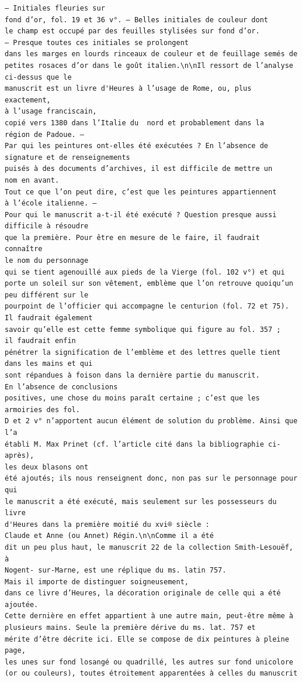 \documentclass[a4paper,12pt,twoside]{book}
\begin{document}
\begin{verbatim}
— Initiales fleuries sur 
fond d’or, fol. 19 et 36 v°. — Belles initiales de couleur dont 
le champ est occupé par des feuilles stylisées sur fond d’or. 
— Presque toutes ces initiales se prolongent 
dans les marges en lourds rinceaux de couleur et de feuillage semés de
petites rosaces d’or dans le goût italien.\n\nIl ressort de l’analyse 
ci-dessus que le 
manuscrit est un livre d'Heures à l’usage de Rome, ou, plus exactement, 
à l’usage franciscain,
copié vers 1380 dans l’Italie du  nord et probablement dans la 
région de Padoue. — 
Par qui les peintures ont-elles été exécutées ? En l’absence de 
signature et de renseignements 
puisés à des documents d’archives, il est difficile de mettre un 
nom en avant.
Tout ce que l’on peut dire, c’est que les peintures appartiennent
à l’école italienne. — 
Pour qui le manuscrit a-t-il été exécuté ? Question presque aussi 
difficile à résoudre 
que la première. Pour être en mesure de le faire, il faudrait connaître
le nom du personnage 
qui se tient agenouillé aux pieds de la Vierge (fol. 102 v°) et qui
porte un soleil sur son vêtement, emblème que l’on retrouve quoiqu’un 
peu différent sur le
pourpoint de l’officier qui accompagne le centurion (fol. 72 et 75). 
Il faudrait également 
savoir qu’elle est cette femme symbolique qui figure au fol. 357 ; 
il faudrait enfin 
pénétrer la signification de l’emblème et des lettres quelle tient 
dans les mains et qui 
sont répandues à foison dans la dernière partie du manuscrit. 
En l’absence de conclusions
positives, une chose du moins paraît certaine ; c’est que les armoiries des fol. 
D et 2 v° n’apportent aucun élément de solution du problème. Ainsi que l’a
établi M. Max Prinet (cf. l’article cité dans la bibliographie ci-après), 
les deux blasons ont
été ajoutés; ils nous renseignent donc, non pas sur le personnage pour qui 
le manuscrit a été exécuté, mais seulement sur les possesseurs du livre 
d'Heures dans la première moitié du xvi® siècle :
Claude et Anne (ou Annet) Régin.\n\nComme il a été
dit un peu plus haut, le manuscrit 22 de la collection Smith-Lesouëf, à 
Nogent- sur-Marne, est une réplique du ms. latin 757. 
Mais il importe de distinguer soigneusement, 
dans ce livre d’Heures, la décoration originale de celle qui a été ajoutée. 
Cette dernière en effet appartient à une autre main, peut-être même à 
plusieurs mains. Seule la première dérive du ms. lat. 757 et 
mérite d’être décrite ici. Elle se compose de dix peintures à pleine page,
les unes sur fond losangé ou quadrillé, les autres sur fond unicolore 
(or ou couleurs), toutes étroitement apparentées à celles du manuscrit 

\end{verbatim}
\end{document}
